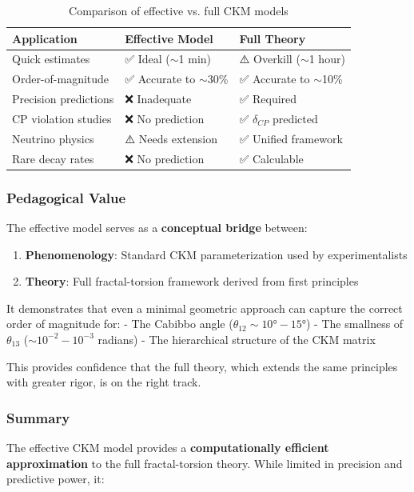 \begin{table}[h]
\centering
\begin{tabular}{p{3.5cm}p{4.5cm}p{4.5cm}}
\toprule
\textbf{Application} & \textbf{Effective Model} & \textbf{Full Theory} \\
\midrule
Quick estimates & ✅ Ideal ($\sim$1 min) & ⚠️ Overkill ($\sim$1 hour) \\
Order-of-magnitude & ✅ Accurate to $\sim$30\% & ✅ Accurate to $\sim$10\% \\
Precision predictions & ❌ Inadequate & ✅ Required \\
CP violation studies & ❌ No prediction & ✅ $\delta_{CP}$ predicted \\
Neutrino physics & ⚠️ Needs extension & ✅ Unified framework \\
Rare decay rates & ❌ No prediction & ✅ Calculable \\
\bottomrule
\end{tabular}
\caption{Comparison of effective vs. full CKM models}
\end{table}

\subsubsection{Pedagogical Value}

The effective model serves as a \textbf{conceptual bridge} between:

\begin{enumerate}
    \item \textbf{Phenomenology}: Standard CKM parameterization used by experimentalists
    \item \textbf{Theory}: Full fractal-torsion framework derived from first principles
\end{enumerate}

It demonstrates that even a minimal geometric approach can capture the correct order of magnitude for:
- The Cabibbo angle ($\theta_{12} \sim 10°-15°$)
- The smallness of $\theta_{13}$ ($\sim 10^{-2}-10^{-3}$ radians)
- The hierarchical structure of the CKM matrix

This provides confidence that the full theory, which extends the same principles with greater rigor, is on the right track.

\subsubsection{Summary}

The effective CKM model provides a \textbf{computationally efficient approximation} to the full fractal-torsion theory. While limited in precision and predictive power, it:

